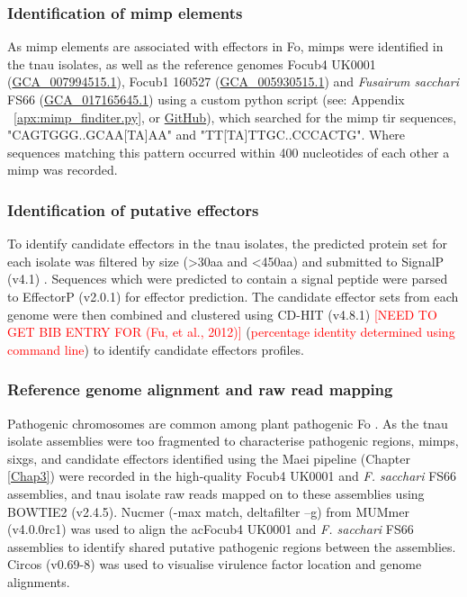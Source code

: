 \subsubsection{Identification of \acl{mimp} elements}

As \acf{mimp} elements are associated with effectors in \ac{Fo}, \acp{mimp} were identified in the \ac{tnau} isolates, as well as the reference genomes \ac{Focub4} UK0001 (\href{https://www.ncbi.nlm.nih.gov/datasets/genome/GCA_007994515.1/}{GCA\_007994515.1}), \ac{Focub1} 160527 (\href{https://www.ncbi.nlm.nih.gov/datasets/genome/GCA_005930515.1/}{GCA\_005930515.1}) and \textit{Fusairum sacchari} FS66 (\href{https://www.ncbi.nlm.nih.gov/datasets/genome/GCA_017165645.1/}{GCA\_017165645.1}) using a custom python script (see: Appendix ~\ref{apx:mimp_finditer.py}, or \href{https://github.com/JamiePike/NewTools-Project/blob/master/bin/mimp_finditer.py}{GitHub}), which searched for the \ac{mimp} \ac{tir} sequences, "CAGTGGG..GCAA[TA]AA" and "TT[TA]TTGC..CCCACTG". Where sequences matching this pattern occurred within 400 nucleotides of each other a \ac{mimp} was recorded. 

\subsubsection{Identification of putative effectors}

To identify candidate effectors in the \ac{tnau} isolates, the predicted protein set for each isolate was filtered by size (>30aa and <450aa) and submitted to SignalP (v4.1) \parencite{Petersen2011}. Sequences which were predicted to contain a signal peptide were parsed to EffectorP (v2.0.1) \parencite{Sperschneider2018} for effector prediction. The candidate effector sets from each genome were then combined and clustered using CD-HIT (v4.8.1) \textcolor{red}{[NEED TO GET BIB ENTRY FOR (Fu, et al., 2012)]} (\textcolor{red}{percentage identity determined using command line}) to identify candidate effectors profiles. 

\subsubsection{Reference genome alignment and raw read mapping}

Pathogenic chromosomes are common among plant pathogenic \ac{Fo} \parencite{Ma2010, Fokkens2020}. As the \ac{tnau} isolate assemblies were too fragmented to characterise  pathogenic regions, \acp{mimp}, \acp{sixg}, and candidate effectors identified using the Maei pipeline (Chapter \ref{Chap3}) were recorded in the high-quality \ac{Focub4} UK0001 and \textit{F. sacchari} FS66 assemblies, and \ac{tnau} isolate raw reads mapped on to these assemblies using BOWTIE2 (v2.4.5). Nucmer (-max match, deltafilter –g) from MUMmer (v4.0.0rc1) \parencite{Marcais2018} was used to align the ac{Focub4} UK0001 and \textit{F. sacchari} FS66 assemblies to identify shared putative pathogenic regions between the assemblies. Circos (v0.69-8) \parencite{Krzywinski2009} was used to visualise virulence factor location and genome alignments. 

